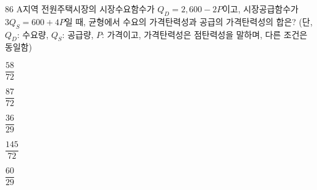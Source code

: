 \begin{question}{86}
A지역 전원주택시장의 시장수요함수가 $Q_D = 2{,}600 - 2P$이고, 시장공급함수가 $3Q_S = 600 + 4P$일 때, 균형에서 수요의 가격탄력성과 공급의 가격탄력성의 합은? (단, $Q_D$: 수요량, $Q_S$: 공급량, $P$: 가격이고, 가격탄력성은 점탄력성을 말하며, 다른 조건은 동일함)
\begin{choices}
  \item $\dfrac{58}{72}$
  \item $\dfrac{87}{72}$
  \item $\dfrac{36}{29}$
  \item $\dfrac{145}{72}$
  \item $\dfrac{60}{29}$
\end{choices}
\end{question}
